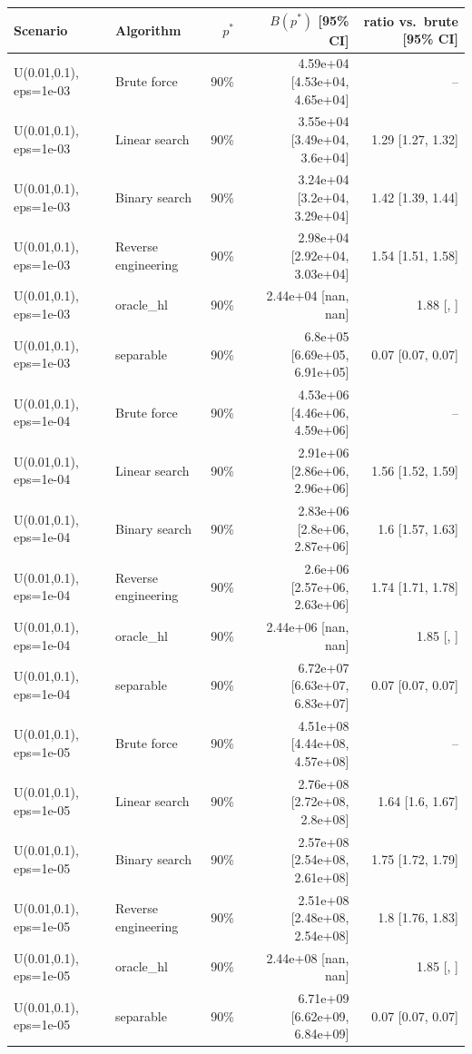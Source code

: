 \begin{tabular}{llrrr}
\toprule
Scenario & Algorithm & $p^*$ & $B(p^*)$ [95\% CI] & ratio vs.\ brute [95\% CI] \\
\midrule
U(0.01,0.1), eps=1e-03 & Brute force & 90\% & 4.59e+04 [4.53e+04, 4.65e+04] & -- \\
U(0.01,0.1), eps=1e-03 & Linear search & 90\% & 3.55e+04 [3.49e+04, 3.6e+04] & 1.29 [1.27, 1.32] \\
U(0.01,0.1), eps=1e-03 & Binary search & 90\% & 3.24e+04 [3.2e+04, 3.29e+04] & 1.42 [1.39, 1.44] \\
U(0.01,0.1), eps=1e-03 & Reverse engineering & 90\% & 2.98e+04 [2.92e+04, 3.03e+04] & 1.54 [1.51, 1.58] \\
U(0.01,0.1), eps=1e-03 & oracle_hl & 90\% & 2.44e+04 [nan, nan] & 1.88 [, ] \\
U(0.01,0.1), eps=1e-03 & separable & 90\% & 6.8e+05 [6.69e+05, 6.91e+05] & 0.07 [0.07, 0.07] \\
U(0.01,0.1), eps=1e-04 & Brute force & 90\% & 4.53e+06 [4.46e+06, 4.59e+06] & -- \\
U(0.01,0.1), eps=1e-04 & Linear search & 90\% & 2.91e+06 [2.86e+06, 2.96e+06] & 1.56 [1.52, 1.59] \\
U(0.01,0.1), eps=1e-04 & Binary search & 90\% & 2.83e+06 [2.8e+06, 2.87e+06] & 1.6 [1.57, 1.63] \\
U(0.01,0.1), eps=1e-04 & Reverse engineering & 90\% & 2.6e+06 [2.57e+06, 2.63e+06] & 1.74 [1.71, 1.78] \\
U(0.01,0.1), eps=1e-04 & oracle_hl & 90\% & 2.44e+06 [nan, nan] & 1.85 [, ] \\
U(0.01,0.1), eps=1e-04 & separable & 90\% & 6.72e+07 [6.63e+07, 6.83e+07] & 0.07 [0.07, 0.07] \\
U(0.01,0.1), eps=1e-05 & Brute force & 90\% & 4.51e+08 [4.44e+08, 4.57e+08] & -- \\
U(0.01,0.1), eps=1e-05 & Linear search & 90\% & 2.76e+08 [2.72e+08, 2.8e+08] & 1.64 [1.6, 1.67] \\
U(0.01,0.1), eps=1e-05 & Binary search & 90\% & 2.57e+08 [2.54e+08, 2.61e+08] & 1.75 [1.72, 1.79] \\
U(0.01,0.1), eps=1e-05 & Reverse engineering & 90\% & 2.51e+08 [2.48e+08, 2.54e+08] & 1.8 [1.76, 1.83] \\
U(0.01,0.1), eps=1e-05 & oracle_hl & 90\% & 2.44e+08 [nan, nan] & 1.85 [, ] \\
U(0.01,0.1), eps=1e-05 & separable & 90\% & 6.71e+09 [6.62e+09, 6.84e+09] & 0.07 [0.07, 0.07] \\

\end{tabular}
